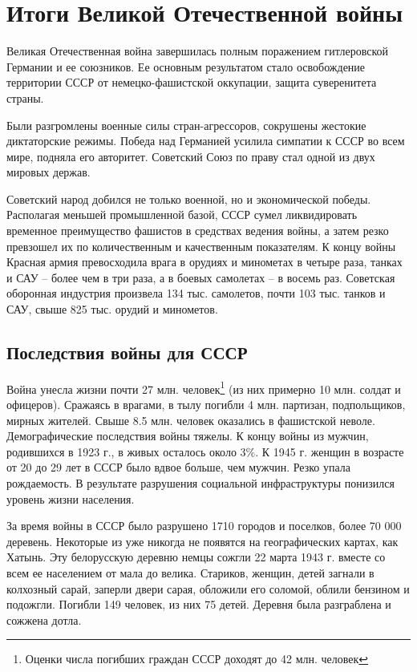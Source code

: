 \documentclass[12pt]{article}
\begin{document}
  \setcounter{section}{4}
  \section{Итоги Великой Отечественной войны}
  Великая Отечественная война завершилась полным поражением гитлеровской Германии и ее союзников.
  Ее основным результатом стало освобождение территории СССР от немецко-фашистской оккупации,
  защита суверенитета страны.

  Были разгромлены военные силы стран-агрессоров, сокрушены жестокие диктаторские режимы.
  Победа над Германией усилила симпатии к СССР во всем мире, подняла его авторитет.
  Советский Союз по праву стал одной из двух мировых держав.

  Советский народ добился не только военной, но и экономической победы.
  Располагая меньшей промышленной базой, СССР сумел ликвидировать временное преимущество фашистов в средствах ведения войны,
  а затем резко превзошел их по количественным и качественным показателям.
  К концу войны Красная армия превосходила врага в орудиях и минометах в четыре раза,
  танках и САУ -- более чем в три раза, а в боевых самолетах -- в восемь раз.
  Советская оборонная индустрия произвела 134 тыс. самолетов, почти 103 тыс. танков и САУ,
  свыше 825 тыс. орудий и минометов.

  \subsection{Последствия войны для СССР}
  Война унесла жизни почти 27 млн. человек\footnote{Оценки числа погибших граждан СССР доходят до 42 млн. человек} (из них примерно 10 млн. солдат и офицеров).
  Сражаясь в врагами, в тылу погибли 4 млн. партизан, подпольщиков, мирных жителей.
  Свыше 8.5 млн. человек оказались в фашистской неволе.
  Демографические последствия войны тяжелы.
  К концу войны из мужчин, родившихся в 1923 г., в живых осталось около 3\%.
  К 1945 г. женщин в возрасте от 20 до 29 лет в СССР было вдвое больше, чем мужчин.
  Резко упала рождаемость.
  В результате разрушения социальной инфраструктуры понизился уровень жизни населения.

  За время войны в СССР было разрушено 1710 городов и поселков, более 70 000 деревень.
  Некоторые из уже никогда не появятся на географических картах, как Хатынь.
  Эту белорусскую деревню немцы сожгли 22 марта 1943 г. вместе со всем ее населением от мала до велика.
  Стариков, женщин, детей загнали в колхозный сарай, заперли двери сарая, обложили его соломой, облили бензином и подожгли.
  Погибли 149 человек, из них 75 детей.
  Деревня была разграблена и сожжена дотла.
\end{document}
